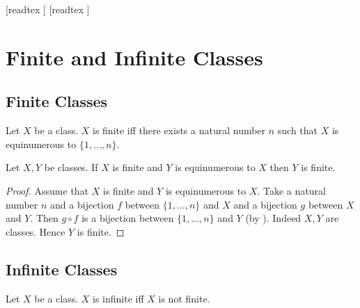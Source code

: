 \documentclass[10pt]{article}
\begin{document}
  \begin{imports}
    \begin{forthel}
      [readtex ]
      [readtex ]
    \end{forthel}
  \end{imports}


  \section*{Finite and Infinite Classes}

  \subsection*{Finite Classes}

  \begin{forthel}
    \begin{definition}
      Let $X$ be a class.
      $X$ is finite iff there exists a natural number $n$ such that $X$ is equinumerous to $\{ 1, \dots, n \}$.
    \end{definition}
  \end{forthel}

  \begin{forthel}
    \begin{proposition}
      Let $X, Y$ be classes.
      If $X$ is finite and $Y$ is equinumerous to $X$ then $Y$ is finite.
    \end{proposition}
    \begin{proof}
      Assume that $X$ is finite and $Y$ is equinumerous to $X$.
      Take a natural number $n$ and a bijection $f$ between $\{ 1, \dots, n \}$ and $X$ and a bijection $g$ between $X$ and $Y$.
      Then $g \circ f$ is a bijection between $\{ 1, \dots, n \}$ and $Y$ (by ).
      Indeed $X, Y$ are classes.
      Hence $Y$ is finite.
    \end{proof}
  \end{forthel}


  \subsection*{Infinite Classes}

  \begin{forthel}
    \begin{definition}
      Let $X$ be a class.
      $X$ is infinite iff $X$ is not finite.
    \end{definition}
  \end{forthel}
\end{document}

